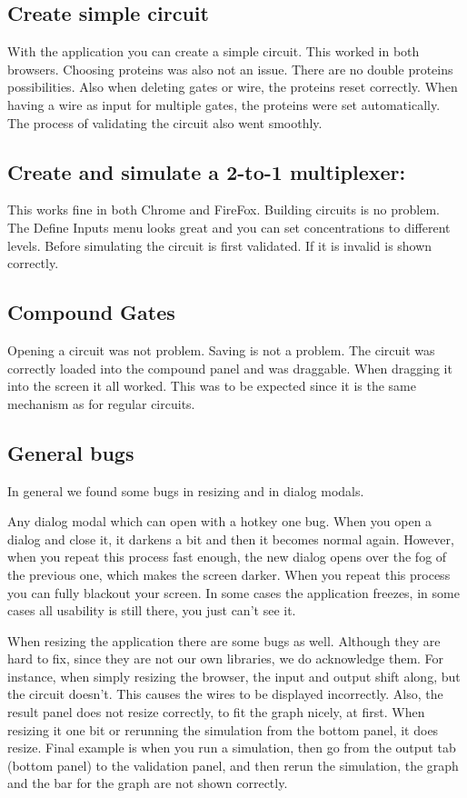 \documentclass[a4paper]{article}
\begin{document}
\subsection{Create simple circuit}
With the application you can create a simple circuit. This worked in both browsers. Choosing proteins was also not an issue. There are no double proteins possibilities. Also when deleting gates or wire, the proteins reset correctly. When having a wire as input for multiple gates, the proteins were set automatically. The process of validating the circuit also went smoothly.

\subsection{Create and simulate a 2-to-1 multiplexer:}
This works fine in both Chrome and FireFox. Building circuits is no problem. The Define Inputs menu looks great and you can set concentrations to different levels. Before simulating the circuit is first validated. If it is invalid is shown correctly.

\subsection{Compound Gates}
Opening a circuit was not problem. Saving is not a problem. The circuit was correctly loaded into the compound panel and was draggable.
When dragging it into the screen it all worked. This was to be expected since it is the same mechanism as for regular circuits.

\subsection{General bugs}
In general we found some bugs in resizing and in dialog modals.

Any dialog modal which can open with a hotkey one bug. When you open a dialog and close it, it darkens a bit and then it becomes normal again. However, when you repeat this process fast enough, the new dialog opens over the fog of the previous one, which makes the screen darker. When you repeat this process you can fully blackout your screen. In some cases the application freezes, in some cases all usability is still there, you just can't see it.

When resizing the application there are some bugs as well. Although they are hard to fix, since they are not our own libraries, we do acknowledge them.
For instance, when simply resizing the browser, the input and output shift along, but the circuit doesn't. This causes the wires to be displayed incorrectly. Also, the result panel does not resize correctly, to fit the graph nicely, at first. When resizing it one bit or rerunning the simulation from the bottom panel, it does resize.
Final example is when you run a simulation, then go from the output tab (bottom panel) to the validation panel, and then rerun the simulation, the graph and the bar for the graph are not shown correctly.
\end{document}
